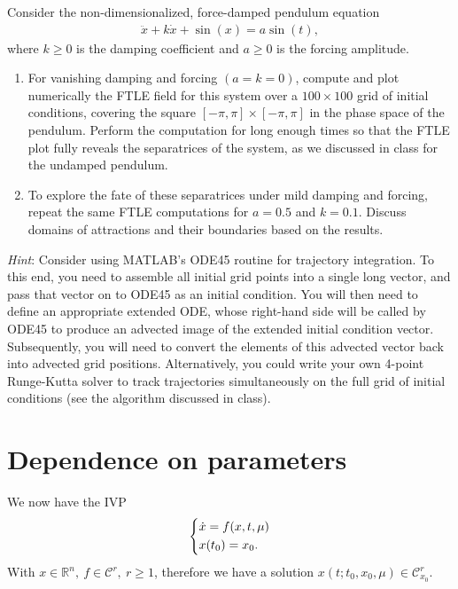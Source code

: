 \begin{exercise}
Consider the non-dimensionalized, force-damped pendulum equation
\begin{align}
	\ddot{x} + k\dot{x} + \sin(x) = a\sin(t),
\end{align}
where $k \geq 0$ is the damping coefficient and $a \geq 0$ is the forcing amplitude.

\begin{enumerate}[label=(\alph*)]
	\item For vanishing damping and forcing $(a=k=0)$, compute and plot numerically the FTLE field for this system over a $100 \times 100$ grid of initial conditions, covering the square $[- \pi, \pi] \times [-\pi, \pi]$ in the phase space of the pendulum. Perform the computation for long enough times so that the FTLE plot fully reveals the separatrices of the system, as we discussed in class for the undamped pendulum.
	\item To explore the fate of these separatrices under mild damping and forcing, repeat the same FTLE computations for $a = 0.5$ and $k = 0.1$. Discuss domains of attractions and their boundaries based on the results.
\end{enumerate}

\textit{Hint}: Consider using MATLAB’s ODE45 routine for trajectory integration. To this end, you need to assemble all initial grid points into a single long vector, and pass that vector on to ODE45 as an initial condition. You will then need to define an appropriate extended ODE, whose right-hand side will be called by ODE45 to produce an advected image of the extended initial condition vector. Subsequently, you will need to convert the elements of this advected vector back into advected grid positions.
Alternatively, you could write your own 4-point Runge-Kutta solver to track trajectories simultaneously on the full grid of initial conditions (see the algorithm discussed in class).

\end{exercise}



\section{Dependence on parameters}
We now have the IVP
\begin{align}
	\begin{dcases}
		\dot{ {x}} = f( {x},t, {\mu} ) \\  {x}(t_0) =  {x}_0.
	\end{dcases}
\end{align}
With $ {x} \in \mathbb{R}^{n},\ f\in \mathcal{C}^r,\ r\geq 1$, therefore we have a solution $ {x}(t; t_0,  {x}_0,  {\mu} ) \in \mathcal{C}^r_{ {x}_0}$.

